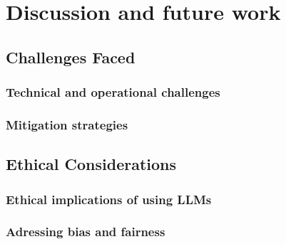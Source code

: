 \chapter{Discussion and future work}

\section{Challenges Faced}
\subsection{Technical and operational challenges}
\subsection{Mitigation strategies}

\section{Ethical Considerations}
\subsection{Ethical implications of using LLMs}
\subsection{Adressing bias and fairness}